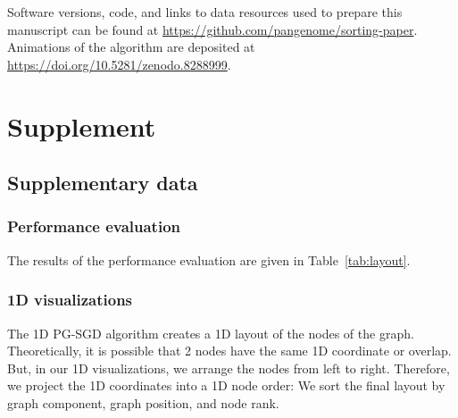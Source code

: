 \documentclass{bioinfo}
\theoremstyle{definition}
\newcommand{\red}[1]{{\textcolor{Red}{#1}}}
\newcommand{\FIXME}[1]{\red{[FIXME: #1]}}
\newcommand{\beginsupplement}{%
	\setcounter{table}{0}
	\renewcommand{\thetable}{S\arabic{table}}%
	\setcounter{figure}{0}
	\renewcommand{\thefigure}{S\arabic{figure}}%
}
\begin{document}
	Software versions, code, and links to data resources used to prepare this manuscript can be found at \url{https://github.com/pangenome/sorting-paper}.
	Animations of the algorithm are deposited at \url{https://doi.org/10.5281/zenodo.8288999}.
		
	
	
	
	
	\clearpage
	\setcounter{page}{1}
	
	\beginsupplement
	
	\section{Supplement}
	
	 \subsection{Supplementary data}
	 \subsubsection{Performance evaluation}
	 \label{sec:performance}
	 The results of the performance evaluation are given in Table~\ref{tab:layout}.
	 
	\subsubsection{1D visualizations}	
	The 1D PG-SGD algorithm creates a 1D layout of the nodes of the graph.
	Theoretically, it is possible that 2 nodes have the same 1D coordinate or overlap.
	But, in our 1D visualizations, we arrange the nodes from left to right.
	Therefore, we project the 1D coordinates into a 1D node order: We sort the final layout by graph component, graph position, and node rank.
	
\end{document}
